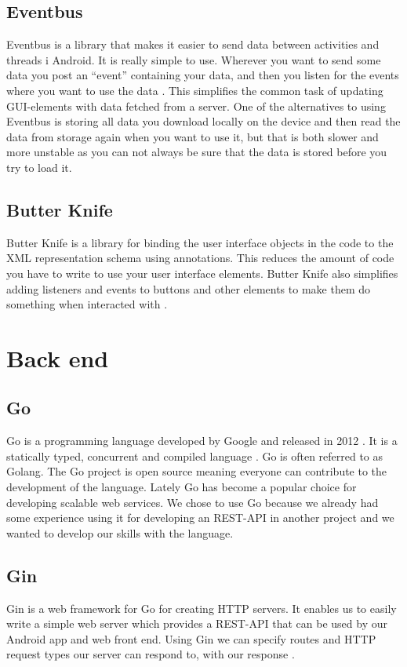 \documentclass[../Main/thesis.tex]{subfiles}
\begin{document}
\subsection{Eventbus}
Eventbus is a library that makes it easier to send data between activities and threads i Android. 
It is really simple to use.
Wherever you want to send some data you post an ``event'' containing your data, and then you listen for the events where you want to use the data \citep{Greenrobot2016}.
This simplifies the common task of updating GUI-elements with data fetched from a server.
One of the alternatives to using Eventbus is storing all data you download locally on the device and then read the data from storage again when you want to use it, but that is both slower and more unstable as you can not always be sure that the data is stored before you try to load it. 

\subsection{Butter Knife}
Butter Knife is a library for binding the user interface objects in the code to the XML representation schema using annotations.
This reduces the amount of code you have to write to use your user interface elements. 
Butter Knife also simplifies adding listeners and events to buttons and other elements to make them do something when interacted with \citep{Wharton2018}.

\section{Back end}

\subsection{Go}
Go is a programming language developed by Google and released in 2012 \citep{Google2018a}.
It is a statically typed, concurrent and compiled language \citep{Pike2012}.
Go is often referred to as Golang. 
The Go project is open source meaning everyone can contribute to the development of the language.
Lately Go has become a popular choice for developing scalable web services.
We chose to use Go because we already had some experience using it for developing an REST-API in another project and we wanted to develop our skills with the language.

\subsection{Gin}
Gin is a web framework for Go for creating HTTP servers.
It enables us to easily write a simple web server which provides a REST-API that can be used by our Android app and web front end. 
Using Gin we can specify routes and HTTP request types our server can respond to, with our response \citep{Martinez-Almeida2017}.
\end{document}
